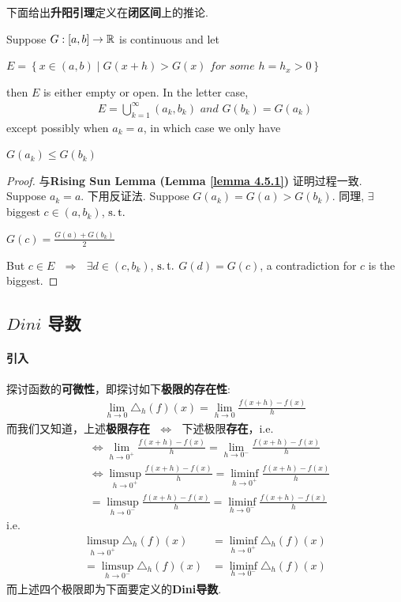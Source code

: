 	\newpage
	下面给出\textbf{升阳引理}定义在\textbf{闭区间}上的推论.
	\begin{corollary}\label{cor 4.5.2}
		Suppose $G : [a , b] \rightarrow \mathbb{R}$ is continuous and let
		\begin{center}
			$E = \left\{ x \in (a , b) \mid G(x + h) > G(x) \,\, for \,\, some \,\, h = h_x > 0 \right\}$
		\end{center}
		then $E$ is either empty or open. In the letter case, 
		\begin{align}
			E = \bigcup_{k = 1}^{\infty}{(a_k , b_k)} \,\, and \,\, G(b_k) = G(a_k)
		\end{align}
		except possibly when $a_k = a$, in which case we only have
		\begin{center}
			$G(a_k) \leq G(b_k)$
		\end{center}
	
		\vspace{8em}
		\begin{proof}
			与\textbf{Rising Sun Lemma (Lemma \ref{lemma 4.5.1})} 证明过程一致. \\
			Suppose $a_k = a$. 下用反证法. Suppose $G(a_k) = G(a) > G(b_k)$. 同理, $\exists$ biggest $c \in (a , b_k)$, $\operatorname{s.t.}$
			\begin{center}
				$G(c) = \frac{G(a) + G(b_k)}{2}$
			\end{center}
			But $c \in E$ $\,\, \Rightarrow \,\,$ $\exists d \in (c , b_k)$, $\operatorname{s.t.}$ $G(d) = G(c)$, a contradiction for $c$ is the biggest.
		\end{proof}
	\end{corollary}

\newpage
\subsection{$Dini$ 导数}
\paragraph{引入}
	探讨函数的\textbf{可微性}，即探讨如下\textbf{极限的存在性}:
	\begin{align}
		\lim_{h \to 0}{\triangle_{h}(f)(x)} = \lim_{h \to 0}{\frac{f(x + h) - f(x)}{h}}
	\end{align}
	而我们又知道，上述\textbf{极限存在} $\,\, \Leftrightarrow \,\,$ 下述极限\textbf{存在}，i.e.
	\begin{align}
		&\Leftrightarrow \lim_{h \to 0^{+}}{\frac{f(x + h) - f(x)}{h}} = \lim_{h \to 0^{-}}{\frac{f(x + h) - f(x)}{h}} \\
		&\Leftrightarrow \limsup_{h \to 0^{+}}{\frac{f(x + h) - f(x)}{h}} = \liminf_{h \to 0^{+}}{\frac{f(x + h) - f(x)}{h}} \\
		&= \limsup_{h \to 0^{-}}{\frac{f(x + h) - f(x)}{h}} = \liminf_{h \to 0^{-}}{\frac{f(x + h) - f(x)}{h}}
	\end{align}
	i.e.
	\begin{align}
		\limsup_{h \to 0^{+}}{\triangle_{h}(f)(x)}
		&= \liminf_{h \to 0^{+}}{\triangle_{h}(f)(x)} \\
		= \limsup_{h \to 0^{-}}{\triangle_{h}(f)(x)}
		&= \liminf_{h \to 0^{-}}{\triangle_{h}(f)(x)}
	\end{align}
	而上述四个极限即为下面要定义的\textbf{Dini导数}.

